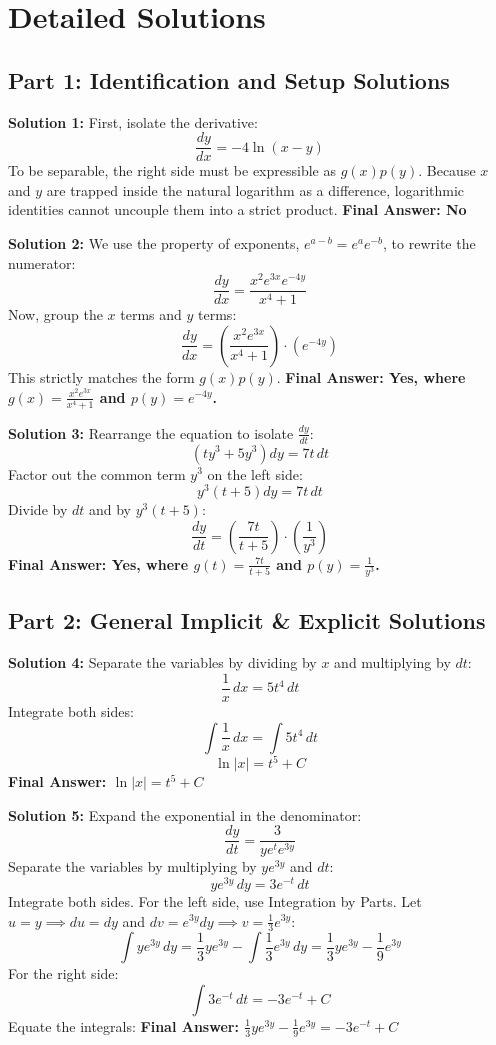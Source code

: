 \documentclass[11pt]{article}
\begin{document}
\section{Detailed Solutions}

\subsection*{Part 1: Identification and Setup Solutions}

\textbf{Solution 1:}
First, isolate the derivative:
\[ \frac{dy}{dx} = -4\ln(x-y) \]
To be separable, the right side must be expressible as $g(x)p(y)$. Because $x$ and $y$ are trapped inside the natural logarithm as a difference, logarithmic identities cannot uncouple them into a strict product. 
\textbf{Final Answer: No}

\textbf{Solution 2:}
We use the property of exponents, $e^{a-b} = e^a e^{-b}$, to rewrite the numerator:
\[ \frac{dy}{dx} = \frac{x^2 e^{3x} e^{-4y}}{x^4 + 1} \]
Now, group the $x$ terms and $y$ terms:
\[ \frac{dy}{dx} = \left(\frac{x^2 e^{3x}}{x^4 + 1}\right) \cdot (e^{-4y}) \]
This strictly matches the form $g(x)p(y)$.
\textbf{Final Answer: Yes, where $g(x) = \frac{x^2 e^{3x}}{x^4 + 1}$ and $p(y) = e^{-4y}$.}

\textbf{Solution 3:}
Rearrange the equation to isolate $\frac{dy}{dt}$:
\[ (ty^3 + 5y^3)dy = 7t \, dt \]
Factor out the common term $y^3$ on the left side:
\[ y^3(t + 5)dy = 7t \, dt \]
Divide by $dt$ and by $y^3(t+5)$:
\[ \frac{dy}{dt} = \left(\frac{7t}{t+5}\right) \cdot \left(\frac{1}{y^3}\right) \]
\textbf{Final Answer: Yes, where $g(t) = \frac{7t}{t+5}$ and $p(y) = \frac{1}{y^3}$.}

\subsection*{Part 2: General Implicit \& Explicit Solutions}

\textbf{Solution 4:}
Separate the variables by dividing by $x$ and multiplying by $dt$:
\[ \frac{1}{x} \, dx = 5t^4 \, dt \]
Integrate both sides:
\[ \int \frac{1}{x} \, dx = \int 5t^4 \, dt \]
\[ \ln|x| = t^5 + C \]
\textbf{Final Answer: $\ln|x| = t^5 + C$}

\textbf{Solution 5:}
Expand the exponential in the denominator:
\[ \frac{dy}{dt} = \frac{3}{y e^t e^{3y}} \]
Separate the variables by multiplying by $y e^{3y}$ and $dt$:
\[ y e^{3y} \, dy = 3e^{-t} \, dt \]
Integrate both sides. For the left side, use Integration by Parts. Let $u = y \implies du = dy$ and $dv = e^{3y} dy \implies v = \frac{1}{3}e^{3y}$:
\[ \int y e^{3y} \, dy = \frac{1}{3}y e^{3y} - \int \frac{1}{3}e^{3y} \, dy = \frac{1}{3}y e^{3y} - \frac{1}{9}e^{3y} \]
For the right side:
\[ \int 3e^{-t} \, dt = -3e^{-t} + C \]
Equate the integrals:
\textbf{Final Answer: $\frac{1}{3}y e^{3y} - \frac{1}{9}e^{3y} = -3e^{-t} + C$}
\end{document}
